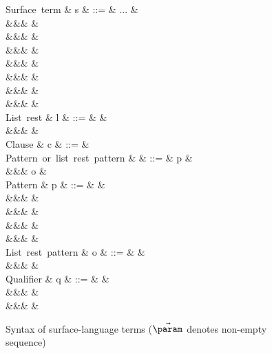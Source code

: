 \begin{figure}[H]
\begin{syntaxfig}
\mbox{Surface term}
&
s
&
::=
&
...
&
\\
&&&
&
\\
&&&
&
\\
&&&
&
\\
&&&
&
\\
&&&
&
\\
&&&
&
\\
&&&
&
\\[2mm]

\mbox{List rest}
&
l
&
::=
&
\annListEnd{\alpha}
&
\\
&&&
&
\\[2mm]

\mbox{Clause}
&
c
&
::=
&
\\[2mm]

\mbox{Pattern or list rest pattern}
&
\pi
&
::=
&
p
&
\\
&&&
o
&
\\[2mm]

\mbox{Pattern}
&
p
&
::=
&
&
\\
&&&
\pattNil
&
\\
&&&
&
\\
&&&
&
\\
&&&
&
\\[2mm]

\mbox{List rest pattern}
&
o
&
::=
&
\pattSNil
&
\\
&&&
&
\\[2mm]

\mbox{Qualifier}
&
q
&
::=
&
&
\\
&&&
&
\\
&&&
&
\\[2mm]

\end{syntaxfig}
\caption{Syntax of surface-language terms ($\vec{\param}$ denotes non-empty sequence)}
\end{figure}
